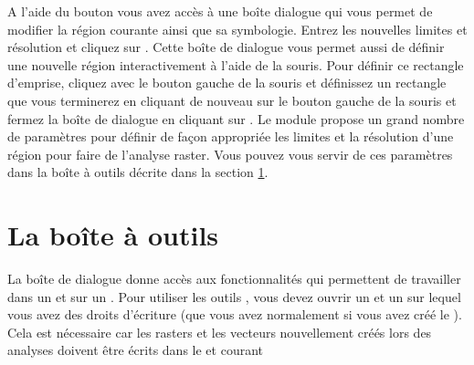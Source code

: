 A l'aide du bouton  vous avez accès à une boîte dialogue qui vous permet de modifier la région courante ainsi que sa symbologie. Entrez les nouvelles limites et résolution et cliquez sur . Cette boîte de dialogue vous permet aussi de définir une nouvelle région interactivement à l'aide de la souris. Pour définir ce rectangle d'emprise, cliquez avec le bouton gauche de la souris et définissez un rectangle que vous terminerez en cliquant de nouveau sur le bouton gauche de la souris et fermez la boîte de dialogue en cliquant sur . Le module \grass {} propose un grand nombre de paramètres pour définir de façon appropriée les limites et la résolution d'une région pour faire de l'analyse raster. Vous pouvez vous servir de ces paramètres dans la boîte à outils \grass décrite dans la section \ref{subsec:grass_toolbox}.

\section{La boîte à outils \grass}\label{subsec:grass_toolbox}


La boîte de dialogue  donne accès aux fonctionnalités \grass qui permettent de travailler dans un  et sur un . Pour utiliser les outils \grass, vous devez ouvrir un  et un  sur lequel vous avez des droits d'écriture (que vous avez normalement si vous avez créé le ). Cela est nécessaire car les rasters et les vecteurs nouvellement créés lors des analyses doivent être écrits dans le  et  courant

